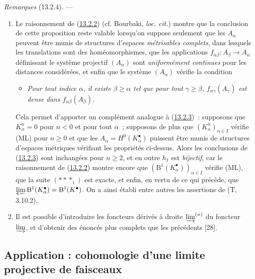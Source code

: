 \begin{env}[13.2.4]
\label{0.13.2.4-fr}
\emph{Remarques} (13.2.4). ---
\begin{enumerate}
\item[(i)]
Le raisonnement de (\hyperref[0.13.2.2-fr]{13.2.2}) (cf. Bourbaki,
\emph{loc. cit.}) montre que la conclusion de cette proposition reste
valable lorsqu'on suppose seulement que les $A_\alpha$ peuvent être munis
de structures d'espaces \emph{métrisables complets}, dans lesquels les
translations sont des homéomorphismes, que les applications
$f_{\alpha\beta}:A_\beta\to A_\alpha$ définissant le système projectif
$(A_\alpha)$ sont \emph{uniformément continues} pour les distances
considérées, et enfin que le système $(A_\alpha)$ vérifie la condition
\begin{itemize}
\item[(ML$'$)]
\emph{Pour tout indice $\alpha$, il existe $\beta\geq\alpha$ tel que pour
tout $\gamma\geq\beta$, $f_{\alpha\gamma}(A_\gamma)$ est dense dans
$f_{\alpha\beta}(A_\beta)$.}
\end{itemize}

Cela permet d'apporter un complément analogue à
(\hyperref[0.13.2.3-fr]{13.2.3})~: supposons que
$K_\alpha^n=0$ pour $n<0$ et pour tout $\alpha$~; supposons de plus que
$(K_\alpha^n)_{\alpha\in I}$ vérifie (ML) pour $n\geq0$ et que les
$A_\alpha=H^0(K_\alpha^\bullet)$ puissent être munis de structures
d'espaces métriques vérifiant les propriétés ci-dessus. Alors les
conclusions de (\hyperref[0.13.2.3-fr]{13.2.3}) sont inchangées pour
$n\geq2$, et en outre $h_1$ est \emph{bijectif}, car le raisonnement de
(\hyperref[0.13.2.2-fr]{13.2.2}) montre encore que
$(\mathrm B^1(K_\alpha^\bullet))_{\alpha\in I}$ vérifie (ML), que la suite
$(***_1)$ est exacte, et enfin, en vertu de ce qui précède, que
$\varprojlim\mathrm B^1(K_\alpha^\bullet)=\mathrm B^1(K^\bullet)$. On a
ainsi établi entre autres les assertions de (T, 3.10.2).

\item[(ii)]
Il est possible d'introduire les foncteurs dérivés à droite
$\varinjlim^{(n)}$ du foncteur $\varinjlim$, et d'obtenir des énoncés
plus complets que les précédents [28].
\end{enumerate}
\end{env}

\subsection{Application : cohomologie d'une limite projective de faisceaux}
\label{subsection:0.13.3-fr}

